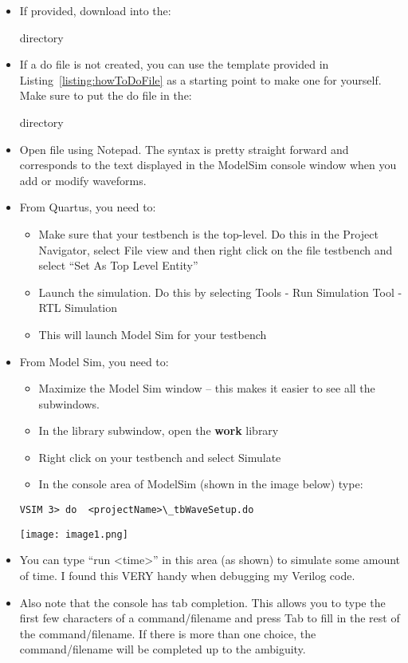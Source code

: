 \begin{itemize}
\item
  If provided, download   into the:
  
 directory
\item
  If a do file is not created, you can use the template provided in
  Listing~\ref{listing:howToDoFile} as a starting point to make one 
  for yourself. Make sure to put the do file in the:
  
   directory
\item
  Open  file using Notepad.
  The syntax is pretty straight forward and corresponds to the text
  displayed in the ModelSim console window when you add or modify
  waveforms.
\item
  From Quartus, you need to:

  \begin{itemize}
  \item
    Make sure that your testbench is the top-level. Do this in the
    Project Navigator, select File view and then right click on the file
    testbench and select ``Set As Top Level Entity''
  \item
    Launch the simulation. Do this by selecting Tools -\> Run Simulation Tool -\> RTL Simulation
  \item
    This will launch Model Sim for your testbench
  \end{itemize}
\item
  From Model Sim, you need to:

  \begin{itemize}
  \item
    Maximize the Model Sim window -- this makes it easier to see all the
    subwindows.
  \item
    In the library subwindow, open the \textbf{work} library
  \item
    Right click on your testbench and select Simulate
  \item
    In the console area of ModelSim (shown in the image below) type:
  \end{itemize}

\begin{verbatim}
VSIM 3> do  <projectName>\_tbWaveSetup.do
\end{verbatim}

\texttt{[image: image1.png]}

\item
  You can type ``run \textless time\textgreater'' in this area (as
  shown) to simulate some amount of time. I found this VERY handy when
  debugging my Verilog code.
\item
  Also note that the console has tab completion. This allows you to type
  the first few characters of a command/filename and press Tab to fill
  in the rest of the command/filename. If there is more than one choice,
  the command/filename will be completed up to the ambiguity.
\end{itemize}


